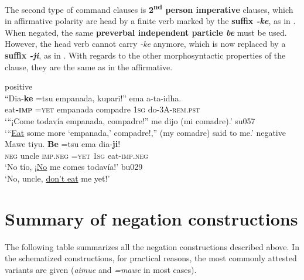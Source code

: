 \documentclass[output=paper]{langsci/langscibook}
\begin{document}
The second type of command clauses is \textbf{2\textsuperscript{nd} person
imperative} clauses, which in affirmative polarity are head by a finite
verb marked by the \textbf{suffix \textit{-ke}}, as in
. When negated, the
same \textbf{preverbal independent particle \textit{be}} must be used.
However, the head verb cannot carry \textit{-ke} anymore, which is now
replaced by a \textbf{suffix \textit{-ji}}, as in
. With regards to the other morphosyntactic properties of the clause, they are the same as in the affirmative.
%
\begin{exe}\ex\label{ex:tacana-imperative} 
\begin{xlist}
\ex\label{ex:tacana-imperative-positive} positive\\
\gll ``Dia-\textbf{ke}  =tsu  empanada,  kupari!''  ema  a-ta-idha.\\
    eat\textbf{-\textsc{imp}}  =\textsc{yet}  empanada  compadre
    1\textsc{sg}  do-3A\textsc{-rem.pst}\\
\glt `{}``¡Come todavía empanada, compadre!'' me dijo (mi comadre).' su057\\
`{}``\underline{Eat} some more `empanada,' compadre!,'' (my comadre) said to me.'
\ex\label{ex:tacana-imperative-negative} negative\\
\gll
Mawe  tiyu.  \textbf{Be}  =tsu  ema  dia-\textbf{ji}!\\
\textsc{neg}  uncle  \textsc{imp.neg}  =\textsc{yet}  1\textsc{sg}
eat-\textsc{imp.neg}\\
\glt `No tío, ¡\underline{No} me comes todavía!' bu029\\
`No, uncle, \underline{don't eat} me yet!'
\end{xlist}\end{exe}

\section{Summary of negation constructions}\label{sec:tacana-9}

The following table summarizes all the negation constructions described
above. In the schematized constructions, for practical reasons, the most
commonly attested variants are given (\textit{aimue} and \textit{=mawe} in
most cases).
\end{document}
